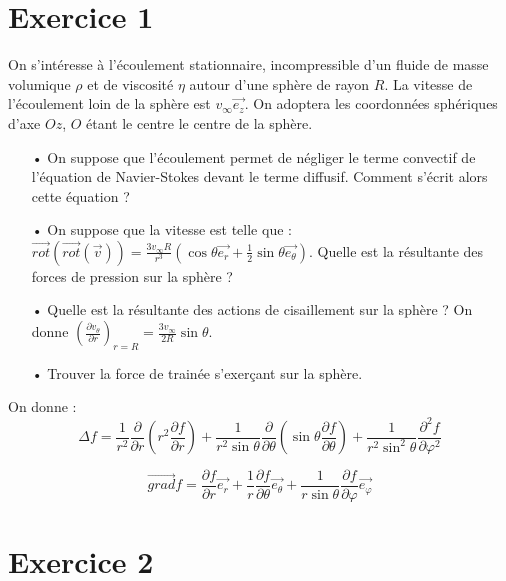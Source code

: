 \documentclass{report}
\begin{document}
\newpage

\section*{Exercice 1}

On s'intéresse à l'écoulement stationnaire, incompressible d'un fluide de masse volumique $\rho$ et de viscosité $\eta$ autour d'une sphère de rayon $R$. La vitesse de l'écoulement loin de la sphère est $v_\infty\vec{e_z}$. On adoptera les coordonnées sphériques d'axe $Oz$, $O$ étant le centre le centre de la sphère. 

\begin{itemize}
	\item[•] On suppose que l'écoulement permet de négliger le terme convectif de l'équation de Navier-Stokes devant le terme diffusif. Comment s'écrit alors cette équation ? 
	\item[•] On suppose que la vitesse est telle que : $\vec{rot}(\vec{rot}(\vec{v}))=\frac{3v_\infty R}{r^3}\left(\cos\theta\vec{e_r}+\frac{1}{2}\sin\theta\vec{e_\theta} \right) $. Quelle est la résultante des forces de pression sur la sphère ? 
	\item[•] Quelle est la résultante des actions de cisaillement sur la sphère ? On donne $\left(\frac{\partial v_\theta}{\partial r}\right)_{r=R}=\frac{3v_\infty}{2R}\sin\theta  $.
	\item[•] Trouver la force de trainée s'exerçant sur la sphère. 
\end{itemize}

On donne : 
\begin{equation}
	\Delta f = \frac{1}{r^2}\frac{\partial}{\partial r} \left(r^2\frac{\partial f}{\partial r} \right) + \frac{1}{r^2\sin\theta}\frac{\partial}{\partial \theta} \left(\sin\theta\frac{\partial f}{\partial \theta} \right) + \frac{1}{r^2\sin^2\theta}\frac{\partial^2 f}{\partial \varphi^2} 
\end{equation}

\begin{equation}
	\vec{grad} f = \frac{\partial f}{\partial r} \vec{e_r} + \frac{1}{r}\frac{\partial f}{\partial \theta}\vec{e_\theta} + \frac{1}{r\sin\theta}\frac{\partial f}{\partial \varphi}\vec{e_\varphi}
\end{equation}

\newpage

\section*{Exercice 2}
\end{document}
